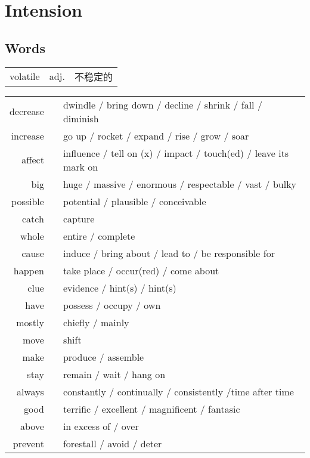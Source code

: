\section{Intension}

\subsection{Words}

\begin{tabular}{lll}
    volatile & adj. & 不稳定的 \\
\end{tabular}

\begin{tabular}{rc@{\quad$\to$\quad}l}
    decrease &  & dwindle / bring down / decline / shrink / fall / diminish        \\
    increase &  & go up / rocket / expand / rise / grow / soar                     \\
    affect   &  & influence / tell on (x) / impact / touch(ed) / leave its mark on \\
    big      &  & huge / massive / enormous / respectable / vast / bulky           \\
    possible &  & potential / plausible / conceivable                              \\
    catch    &  & capture                                                          \\
    whole    &  & entire / complete                                                \\
    cause    &  & induce / bring about / lead to / be responsible for              \\
    happen   &  & take place / occur(red) / come about                             \\
    clue     &  & evidence / hint(s) / hint(s)                                     \\
    have     &  & possess / occupy / own                                           \\
    mostly   &  & chiefly / mainly                                                 \\
    move     &  & shift                                                            \\
    make     &  & produce / assemble                                               \\
    stay     &  & remain / wait / hang on                                          \\
    always   &  & constantly / continually / consistently /time after time         \\
    good     &  & terrific / excellent / magnificent / fantasic                    \\
    above    &  & in excess of / over                                              \\
    prevent  &  & forestall / avoid / deter                                        \\
\end{tabular}

